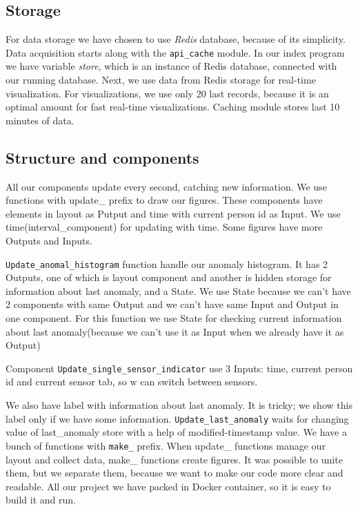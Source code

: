 \documentclass{article}
\begin{document}
\subsection{Storage}
For data storage we have chosen to use \textit{Redis} database, because of its simplicity. Data acquisition starts along with the \texttt{api\_cache} module. In our index program we have variable \textit{store}, which is an instance of Redis database, connected with our running database. Next, we use data from Redis storage for real-time visualization. For visualizations, we use only 20 last records, because it is an optimal amount for fast real-time visualizations. Caching module stores last 10 minutes of data.
\subsection{Structure and components}
All our components update every second, catching new information. We use functions with update\_ prefix to draw our figures. These components have elements in layout as Putput and time with
current person id as Input. We use time(interval\_component) for updating with time. Some figures have more Outputs and Inputs.

\texttt{Update\_anomal\_histogram} function handle our anomaly histogram. It has 2 Outputs, one of which is layout component and another is hidden storage for information about last anomaly, and a State. We use State because we can't have 2 components with same Output and we can't have same Input and Output in one component. For this function we use State for checking current information about last anomaly(because we can't use it as Input when we already have it as Output)

Component \texttt{Update\_single\_sensor\_indicator} use 3 Inputs: time, current person id and current sensor tab, so w can switch between sensors.

We also have label with information about last anomaly. It is tricky; we show this label only if we have some information. \texttt{Update\_last\_anomaly} waits for changing value of last\_anomaly store with a help of modified-timestamp value.
\newline
We have a bunch of functions with \texttt{make\_} prefix. When update\_ functions manage our layout and collect data, make\_ functions create figures. It was possible to unite them, but we separate them, because we want to make our code more clear and readable.
\newline
All our project we have packed in Docker container, so it is easy to build it and run.
\end{document}
